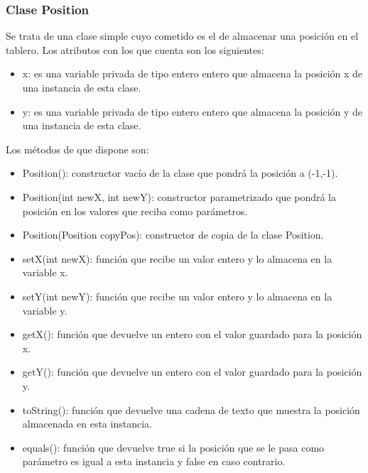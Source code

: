 \documentclass[a4paper,12pt,twoside,openright]{report}
\begin{document}
      \subsubsection{Clase Position}
      Se trata de una clase simple cuyo cometido es el de almacenar una posición en el tablero.
      Los atributos con los que cuenta son los siguientes:
      \begin{itemize}
       \item x: es una variable privada de tipo entero entero que almacena la posición x de una instancia de esta clase.
       \item y: es una variable privada de tipo entero entero que almacena la posición y de una instancia de esta clase.
      \end{itemize}
      Los métodos de que dispone son:
      \begin{itemize}
       \item Position(): constructor vacío de la clase que pondrá la posición a (-1,-1).
       \item Position(int newX, int newY): constructor parametrizado que pondrá la posición en los valores que reciba como parámetros.
       \item Position(Position copyPos): constructor de copia de la clase Position.
       \item setX(int newX): función que recibe un valor entero y lo almacena en la variable x.
       \item setY(int newY): función que recibe un valor entero y lo almacena en la variable y.
       \item getX(): función que devuelve un entero con el valor guardado para la posición x.
       \item getY(): función que devuelve un entero con el valor guardado para la posición y.
       \item toString(): función que devuelve una cadena de texto que muestra la posición almacenada en esta instancia.
       \item equals(): función que devuelve true si la posición que se le pasa como parámetro es igual a esta instancia y false en caso contrario.
      \end{itemize}
\end{document}
